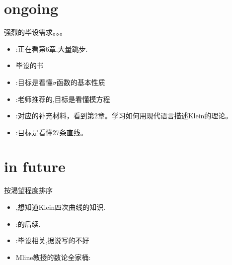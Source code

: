\documentclass{ctexart}
\begin{document}
\section{ongoing}
强烈的毕设需求。。。
\begin{itemize}
	\item \cite[Chap 1-4]{bruinier20081}:正在看第6章.大量跳步.
	\item \cite{klein2003lectures,klein1892vorlesungen}毕设的书
	\item \cite{mumford1974abelian}:目标是看懂$\sigma$函数的基本性质
	\item \cite{shimura1971introduction}:老师推荐的,目标是看懂模方程
	\item \cite{shurman1997geometry}:对应的补充材料，看到第2章。学习如何用现代语言描述Klein的理论。
	\item \cite{mumford1995algebraic}\cite{reid1988undergraduate}:目标是看懂27条直线。
	
\end{itemize}
\section{in future}
按渴望程度排序
\begin{itemize}
	\item \cite{moduli1991mathematical},想知道Klein四次曲线的知识.
	\item \cite{bruinier20081}:\cite{bruinier20081}的后续.
	\item \cite{fricke1897vorlesungen}:毕设相关,据说写的不好
	\item Mline教授的数论全家桶:\cite{milne2006elliptic,milne1986jacobian,milne2005introduction}
\end{itemize}

\renewcommand\refname{{\textbf{参考文献}}}
	

\end{document}
